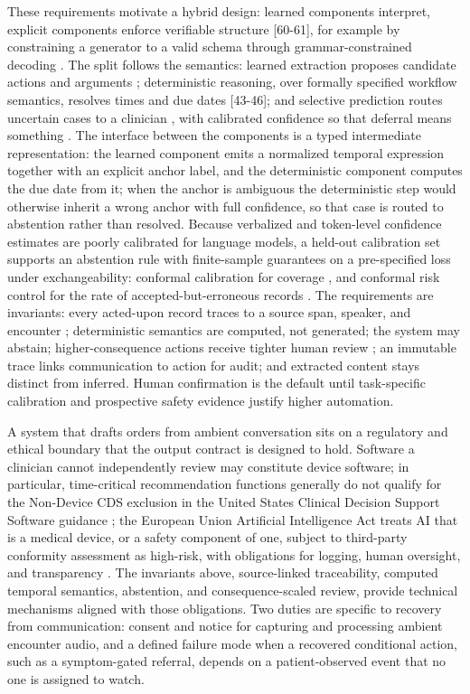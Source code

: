 These requirements motivate a hybrid design: learned components interpret, explicit components enforce verifiable structure {[}60-61{]}, for example by constraining a generator to a valid schema through grammar-constrained decoding \cite{ref62}. The split follows the semantics: learned extraction proposes candidate actions and arguments \cite{ref42}; deterministic reasoning, over formally specified workflow semantics, resolves times and due dates {[}43-46{]}; and selective prediction routes uncertain cases to a clinician \cite{ref63}, with calibrated confidence so that deferral means something \cite{ref64}. The interface between the components is a typed intermediate representation: the learned component emits a normalized temporal expression together with an explicit anchor label, and the deterministic component computes the due date from it; when the anchor is ambiguous the deterministic step would otherwise inherit a wrong anchor with full confidence, so that case is routed to abstention rather than resolved. Because verbalized and token-level confidence estimates are poorly calibrated for language models, a held-out calibration set supports an abstention rule with finite-sample guarantees on a pre-specified loss under exchangeability: conformal calibration for coverage \cite{ref65}, and conformal risk control for the rate of accepted-but-erroneous records \cite{ref66}. The requirements are invariants: every acted-upon record traces to a source span, speaker, and encounter \cite{ref49}; deterministic semantics are computed, not generated; the system may abstain; higher-consequence actions receive tighter human review \cite{ref67}; an immutable trace links communication to action for audit; and extracted content stays distinct from inferred. Human confirmation is the default until task-specific calibration and prospective safety evidence justify higher automation.

A system that drafts orders from ambient conversation sits on a regulatory and ethical boundary that the output contract is designed to hold. Software a clinician cannot independently review may constitute device software; in particular, time-critical recommendation functions generally do not qualify for the Non-Device CDS exclusion in the United States Clinical Decision Support Software guidance \cite{ref68}; the European Union Artificial Intelligence Act treats AI that is a medical device, or a safety component of one, subject to third-party conformity assessment as high-risk, with obligations for logging, human oversight, and transparency \cite{ref69}. The invariants above, source-linked traceability, computed temporal semantics, abstention, and consequence-scaled review, provide technical mechanisms aligned with those obligations. Two duties are specific to recovery from communication: consent and notice for capturing and processing ambient encounter audio, and a defined failure mode when a recovered conditional action, such as a symptom-gated referral, depends on a patient-observed event that no one is assigned to watch.

